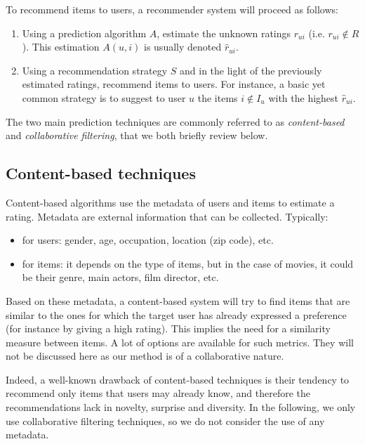 \documentclass{llncs}
\begin{document}
To recommend items to users, a recommender system will proceed as follows:
\begin{enumerate}
\item Using a prediction algorithm $A$, estimate the unknown ratings $r_{ui}$
(i.e. $r_{ui} \notin R$). This estimation $A(u, i)$ is usually denoted
$\hat{r}_{ui}$.  
\item Using a recommendation strategy $S$ and in the light of the previously
estimated ratings, recommend items to users. For instance, a basic yet
common strategy is to suggest to user $u$ the items $i \notin I_u$ with the
highest $\hat{r}_{ui}$.
\end{enumerate}
The two main prediction techniques are commonly referred to as {\it
content-based} and {\it collaborative filtering}, that we both briefly review
below.


\subsection{Content-based techniques}

Content-based algorithms use the metadata of users and items to estimate a
rating. Metadata are external information that can be collected. Typically:
\begin{itemize}
\item  for users: gender, age, occupation, location (zip code), etc.
\item for items: it depends on the type of items, but in the case of movies, it
could be their genre, main actors, film director, etc.  \end{itemize}
 
Based on these metadata, a content-based system will try to find items that are
similar to the ones for which the target user has already expressed a
preference (for instance by giving a high rating). This implies the need for a
similarity measure between items.  A lot of options are available for such
metrics. They will not be discussed here as our method is of a collaborative
nature. 

Indeed, a well-known drawback of content-based techniques is their tendency to
recommend only items that users may already know, and therefore the
recommendations lack in novelty, surprise and diversity. In the following, we
only use collaborative filtering techniques, so we do not consider the use of
any metadata.
\end{document}
